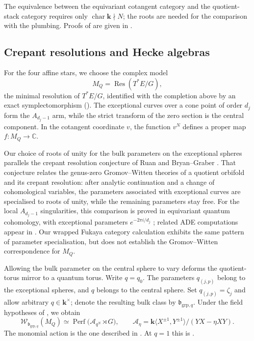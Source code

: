 \documentclass[a4paper]{amsart}
\newcommand{\kk}{\mathbf{k}}
\newcommand{\C}{\mathbb{C}}
\DeclareMathOperator{\Perf}{Perf}
\numberwithin{equation}{section}
\begin{document}
The equivalence between the equivariant cotangent category and the
quotient-stack category requires only
$\operatorname{char}\kk\nmid N$; the roots are needed for the
comparison with the plumbing. Proofs of
 are given in
.

\subsection{Crepant resolutions and Hecke algebras}

For the four affine stars, we choose the complex model
\[
 M_Q=\operatorname{Res}(T^*E/G),
\]
the minimal resolution of $T^*E/G$, identified with the completion
above by an exact symplectomorphism ().
The exceptional curves over a
cone point of order $d_j$ form the $A_{d_j-1}$ arm, while the
strict transform of the zero section is the central component.
In the cotangent coordinate $v$, the function $v^N$ defines a
proper map $f:M_Q\to\C$.

Our choice of roots of unity for the bulk parameters on the
exceptional spheres parallels the crepant resolution conjecture
of Ruan \cite[Section~2]{RuanCRC} and Bryan--Graber
\cite[Conjecture~1.2]{BryanGraber}.
That conjecture relates the genus-zero Gromov--Witten theories
of a quotient orbifold and its crepant resolution: after analytic
continuation and a change of cohomological variables, the
parameters associated with exceptional curves are specialised to
roots of unity, while the remaining parameters stay free.
For the local $A_{d_j-1}$ singularities, this comparison is proved
in equivariant quantum cohomology, with exceptional parameters
$e^{-2\pi i/d_j}$ \cite[Theorem~A.1 and Corollary~A.2]{CCIT};
related ADE computations appear in \cite{BryanGholampour}.
Our wrapped Fukaya category calculation exhibits the same pattern
of parameter specialisation, but does not establish the
Gromov--Witten correspondence for $M_Q$.

Allowing the bulk parameter on the central sphere to vary deforms
the quotient-torus mirror to a quantum torus.
Write $q=q_0$. The parameters $q_{(j,p)}$
belong to the exceptional spheres, and $q$ belongs to the central
sphere. Set $q_{(j,p)}=\zeta_j$ and allow arbitrary $q\in\kk^\times$;
denote the resulting bulk class by $\mathfrak b_{\mathrm{grp},q}$.
Under the field hypotheses of , we obtain
\begin{equation}\label{eq:intro-quantum-mirror}
 \mathcal W_{\mathfrak b_{\mathrm{grp},q}}(M_Q)
 \simeq\Perf\bigl(\mathcal A_{q^N}\rtimes G\bigr),\qquad
 \mathcal A_\eta=
 \kk\langle X^{\pm1},Y^{\pm1}\rangle/(YX-\eta XY).
\end{equation}
The monomial action is the one described in \cite[Section~4.1]{EOR}.
At $q=1$ this is .
\end{document}
